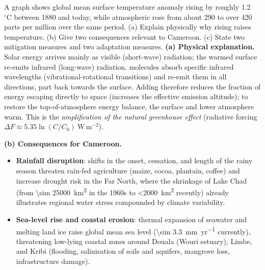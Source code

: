 \documentclass[11pt]{article}
\begin{document}
\begin{exoresolu}
A graph shows global mean surface temperature anomaly rising by roughly \SI{1.2}{\ensuremath{{}^{\circ}\mathrm{C}}} between 1880 and today, while atmospheric  rose from about 290 to over 420 parts per million over the same period. (a) Explain physically why rising  raises temperature. (b) Give two consequences relevant to Cameroon. (c) State two mitigation measures and two adaptation measures.
\tcblower
\textbf{(a) Physical explanation.} Solar energy arrives mainly as visible (short-wave) radiation; the warmed surface re-emits infrared (long-wave) radiation.  molecules absorb specific infrared wavelengths (vibrational-rotational transitions) and re-emit them in all directions, part back towards the surface. Adding  therefore reduces the fraction of energy escaping directly to space (increases the effective emission altitude); to restore the top-of-atmosphere energy balance, the surface and lower atmosphere warm. This is the \emph{amplification of the natural greenhouse effect} (radiative forcing $\Delta F \approx 5.35 \ln(C/C_0)\ \mathrm{W\,m^{-2}}$).

\textbf{(b) Consequences for Cameroon.}
\begin{itemize}
\item \textbf{Rainfall disruption}: shifts in the onset, cessation, and length of the rainy season threaten rain-fed agriculture (maize, cocoa, plantain, coffee) and increase drought risk in the Far North, where the shrinkage of Lake Chad (from \SI{\sim 25000}{km^2} in the 1960s to \SI{<2000}{km^2} recently) already illustrates regional water stress compounded by climate variability.
\item \textbf{Sea-level rise and coastal erosion}: thermal expansion of seawater and melting land ice raise global mean sea level (\SI{\sim 3.3}{mm.yr^{-1}} currently), threatening low-lying coastal zones around Douala (Wouri estuary), Limbe, and Kribi (flooding, salinisation of soils and aquifers, mangrove loss, infrastructure damage).
\end{itemize}


\end{exoresolu}
\end{document}
